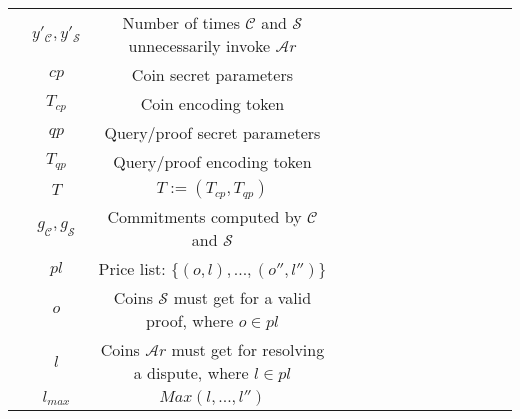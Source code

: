 \begin{table*}[!htbp]
\begin{scriptsize}
\begin{center}
{{\begin{tabular}{|c|c|c|c|c|c|c|c|c|c|c|c|c|c|}
            
&\cellcolor{white!20}\scriptsize$y'_{\scriptscriptstyle\mathcal{C}},y'_{\scriptscriptstyle\mathcal{S}}$ &\cellcolor{white!20}\scriptsize  Number of times  $\mathcal{C}$ and $\mathcal{S}$ unnecessarily invoke $\mathcal{A}r$\\ 
            
                     
&\cellcolor{gray!20}\scriptsize${cp}$ &\cellcolor{gray!20}\scriptsize  Coin secret parameters\\ 
               
&\cellcolor{white!20}\scriptsize$T_{\scriptscriptstyle cp}$ &\cellcolor{white!20}\scriptsize  Coin encoding token\\ 
                
&\cellcolor{gray!20}\scriptsize${qp}$ &\cellcolor{gray!20}\scriptsize  Query/proof secret parameters\\ 
                 
&\cellcolor{white!20}\scriptsize$T_{\scriptscriptstyle qp}$ &\cellcolor{white!20}\scriptsize  Query/proof encoding token\\ 
                  
&\cellcolor{gray!20}\scriptsize$T$ &\cellcolor{gray!20}\scriptsize  $T:=(T_{\scriptscriptstyle cp},T_{\scriptscriptstyle qp})$\\
            

            
&\cellcolor{white!20}\scriptsize$g_{\scriptscriptstyle\mathcal{C}},g_{\scriptscriptstyle\mathcal{S}}$ &\cellcolor{white!20}\scriptsize  Commitments computed by $\mathcal{C}$ and $\mathcal{S}$ \\ 


&\cellcolor{gray!20}\scriptsize$pl$ &\cellcolor{gray!20}\scriptsize  Price list: $\{(o,l),...,(o'',l'')\}$\\ 
        
   &\cellcolor{white!20}\scriptsize$o$ &\cellcolor{white!20}\scriptsize  Coins $\mathcal{S}$ must get for a valid proof, where $o\in pl$ \\ 
                 
&\cellcolor{gray!20}\scriptsize$l$ &\cellcolor{gray!20}\scriptsize  Coins  $\mathcal{A}r$ must get for resolving a dispute, where $l\in pl$ \\      
        
                
     &\scriptsize$l_{\scriptscriptstyle max}$ &\scriptsize   $Max(l,...,l'')$\\            
                

\end{tabular}}}
\end{center}
\end{scriptsize}
\end{table*}
